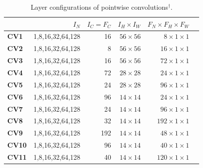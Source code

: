 \begin{table}[]
\caption{Layer configurations of pointwise convolutions$^{\dag}$.}
\label{tab:pwconv}
\begin{threeparttable}
\begin{tabular}{lrrrrr}
\toprule
& \textbf{$I_N$} & \textbf{$I_C=F_C$} & \textbf{$I_H \times I_W$} & \textbf{$F_N \times F_H \times F_W$} \\
\midrule
\textbf{CV1}  & 1,8,16,32,64,128  & 16    & $56\times 56$   & $8 \times 1\times 1$\\
\textbf{CV2}  & 1,8,16,32,64,128  & 8     & $56\times 56$   & $16 \times 1\times 1$\\
\textbf{CV3}  & 1,8,16,32,64,128  & 16    & $56\times 56$   & $72 \times 1\times 1$\\
\textbf{CV4}  & 1,8,16,32,64,128  & 72    & $28\times 28$   & $24 \times 1\times 1$\\
\textbf{CV5}  & 1,8,16,32,64,128  & 24    & $28\times 28$   & $96 \times 1\times 1$\\
\textbf{CV6}  & 1,8,16,32,64,128  & 96    & $14\times 14$   & $24 \times 1\times 1$\\
\textbf{CV7} & 1,8,16,32,64,128  & 24    & $14\times 14$   & $96  \times 1\times 1$\\
\textbf{CV8} & 1,8,16,32,64,128  & 32    & $14\times 14$   & $192 \times 1\times 1$\\
\textbf{CV9} & 1,8,16,32,64,128  & 192   & $14\times 14$   & $48  \times 1\times 1$\\
\textbf{CV10} & 1,8,16,32,64,128  & 96    & $14\times 14$   & $40 \times 1\times 1$\\
\textbf{CV11} & 1,8,16,32,64,128  & 40    & $14\times 14$   & $120 \times 1\times 1$\\

\end{tabular}
\end{threeparttable}
\end{table}
